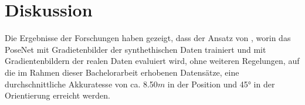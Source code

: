 
\section{Diskussion}
\label{sec:kapitel_5}
Die Ergebnisse der Forschungen haben gezeigt, dass der Ansatz von \citet{acharyaBIMPoseNetIndoorCamera2019}, worin das PoseNet mit Gradietenbilder der synthethischen Daten trainiert und mit Gradientenbildern der realen Daten evaluiert wird,  ohne weiteren Regelungen, auf die im Rahmen dieser Bachelorarbeit erhobenen Datensätze, eine durchschnittliche Akkuratesse von ca. 8.50$m$ in der Position und 45° in der Orientierung erreicht werden. 